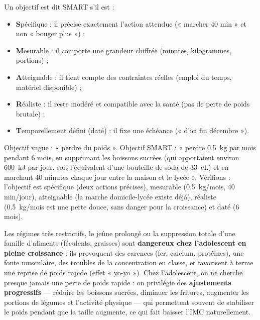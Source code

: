 \documentclass[11pt]{article}
\newcommand{\cle}[1]{{\popxbold\color{popdark}#1}}
\begin{document}
\begin{definition}
Un objectif est dit \cle{SMART} s'il est :
\begin{itemize}
\item \textbf{S}pécifique : il précise exactement l'action attendue (« marcher 40 min » et non « bouger plus ») ;
\item \textbf{M}esurable : il comporte une grandeur chiffrée (minutes, kilogrammes, portions) ;
\item \textbf{A}tteignable : il tient compte des contraintes réelles (emploi du temps, matériel disponible) ;
\item \textbf{R}éaliste : il reste modéré et compatible avec la santé (pas de perte de poids brutale) ;
\item \textbf{T}emporellement défini (daté) : il fixe une échéance (« d'ici fin décembre »).
\end{itemize}
\end{definition}

\begin{exemplebox}
Objectif vague : « perdre du poids ». Objectif SMART : « perdre \SI{0,5}{kg} par mois pendant 6 mois, en supprimant les boissons sucrées (qui apportaient environ \SI{600}{kJ} par jour, soit l'équivalent d'une bouteille de soda de \SI{33}{cL}) et en marchant 40 minutes chaque jour entre la maison et le lycée ». Vérifions : l'objectif est spécifique (deux actions précises), mesurable (\SI{0,5}{kg}/mois, 40 min/jour), atteignable (la marche domicile-lycée existe déjà), réaliste (\SI{0,5}{kg}/mois est une perte douce, sans danger pour la croissance) et daté (6 mois).
\end{exemplebox}

\begin{attention}
Les régimes très restrictifs, le jeûne prolongé ou la suppression totale d'une famille d'aliments (féculents, graisses) sont \textbf{dangereux chez l'adolescent en pleine croissance} : ils provoquent des carences (fer, calcium, protéines), une fonte musculaire, des troubles de la concentration en classe, et favorisent à terme une reprise de poids rapide (effet « yo-yo »). Chez l'adolescent, on ne cherche presque jamais une perte de poids rapide : on privilégie des \textbf{ajustements progressifs} — réduire les boissons sucrées, diminuer les fritures, augmenter les portions de légumes et l'activité physique — qui permettent souvent de stabiliser le poids pendant que la taille augmente, ce qui fait baisser l'IMC naturellement.
\end{attention}
\end{document}
